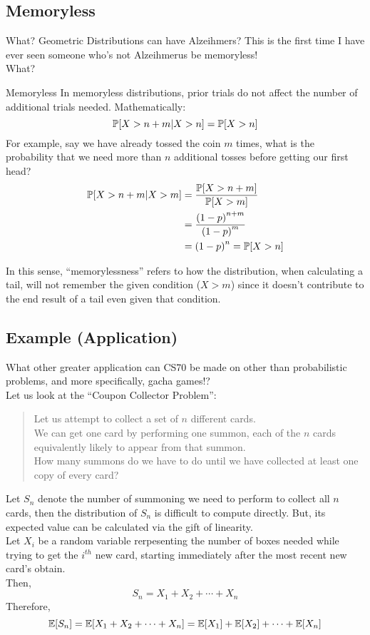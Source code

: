 \subsection{Memoryless}
What? Geometric Distributions can have Alzeihmers? This is the first time I have ever seen someone who's not Alzeihmerus be memoryless! \\
What? \\
\begin{ln-define}{Memoryless}{}
    In memoryless distributions, prior trials do not affect the number of additional trials needed. Mathematically:
    \[\P[X > n + m | X > n] = \P[X > n]\]
    For example, say we have already tossed the coin $m$ times, what is the probability that we need more than $n$ additional tosses before getting our first head?
    \begin{align*}
        \P[X > n + m | X > m]
        &= \frac{\P[X > n + m]}{\P[X > m]} \\
        &= \frac{{(1 - p)}^{n + m}}{{(1 - p)}^m} \\
        &= {(1 - p)}^n = \P[X > n]
    \end{align*}
\end{ln-define}
In this sense, ``memorylessness'' refers to how the distribution, when calculating a tail, will not remember the given condition ($X > m$) since it doesn't contribute to the end result of a tail even given that condition.

\subsection{Example (Application)}
What other greater application can CS70 be made on other than probabilistic problems, and more specifically, gacha games!? \\
Let us look at the ``Coupon Collector Problem'':
\begin{quote}
    Let us attempt to collect a set of $n$ different cards. \\
    We can get one card by performing one summon, each of the $n$ cards equivalently likely to appear from that summon. \\
    How many summons do we have to do until we have collected at least one copy of every card?
\end{quote}
Let $S_n$ denote the number of summoning we need to perform to collect all $n$ cards, then the distribution of $S_n$ is difficult to compute directly. But, its expected value can be calculated via the gift of linearity. \\
Let $X_i$ be a random variable rerpesenting the number of boxes needed while trying to get the $i^{th}$ new card, starting immediately after the most recent new card's obtain. \\
Then,
\[S_n = X_1 + X_2 + \cdots + X_n\]
Therefore,
\[\E[S_n] = \E[X_1 + X_2 + \cdots + X_n] = \E[X_1] + \E[X_2] + \cdots + \E[X_n]\]

